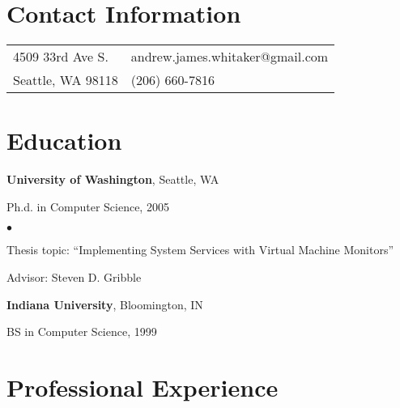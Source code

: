 \documentclass[margin,line]{res}
\newenvironment{list1}{
  \begin{list}{\ding{113}}{%
      \setlength{\itemsep}{0in}
      \setlength{\parsep}{0in} \setlength{\parskip}{0in}
      \setlength{\topsep}{0in} \setlength{\partopsep}{0in} 
      \setlength{\leftmargin}{0.17in}}}{\end{list}}
\newenvironment{list2}{
  \begin{list}{$\bullet$}{%
      \setlength{\itemsep}{0in}
      \setlength{\parsep}{0in} \setlength{\parskip}{0in}
      \setlength{\topsep}{0in} \setlength{\partopsep}{0in} 
      \setlength{\leftmargin}{0.2in}}}{\end{list}}
\begin{document}

\begin{resume}
\section{\sc Contact Information}
\vspace{.05in}
\begin{tabular}{@{}p{4in}p{2in}}
4509 33rd Ave S. & andrew.james.whitaker@gmail.com \\
Seattle, WA  98118 &  (206) 660-7816  \\
\end{tabular}

\section{\sc Education}
{\bf University of Washington}, Seattle, WA\\
\vspace*{-.1in}
\begin{list1}
\item[] Ph.d. in Computer Science, 2005
\begin{list2}
  \vspace*{.05in}
  \item Thesis topic: ``Implementing System Services with Virtual Machine Monitors''
  \item Advisor: Steven D. Gribble
\end{list2}
\end{list1}

{\bf Indiana University}, Bloomington, IN \\
\vspace*{-.1in}
\begin{list1}
\item[] BS in Computer Science, 1999
\end{list1}

\section{\sc Professional Experience}


\end{resume}
\end{document}
